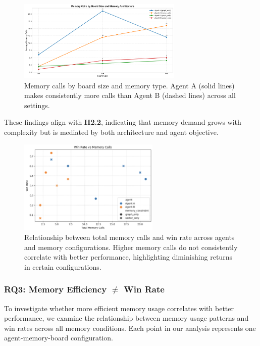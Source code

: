\documentclass[10pt]{article}
\begin{document}
\begin{figure}[ht]
\centering
\includegraphics[width=0.7\textwidth]{figures/memory_calls_by_board_size.png}
\caption{Memory calls by board size and memory type. Agent A (solid lines) makes consistently more calls than Agent B (dashed lines) across all settings.}
\label{fig:memory_calls}
\end{figure}

These findings align with \textbf{H2.2}, indicating that memory demand grows with complexity but is mediated by both architecture and agent objective.

\begin{figure}[ht]
    \centering
    \includegraphics[width=0.6\textwidth]{figures/analysis/scatter_win_rate.png}
    \caption{Relationship between total memory calls and win rate across agents and memory configurations. Higher memory calls do not consistently correlate with better performance, highlighting diminishing returns in certain configurations.}
    \label{fig:scatter_win_rate}
    \end{figure}

\subsubsection{RQ3: Memory Efficiency $\neq$ Win Rate}

To investigate whether more efficient memory usage correlates with better performance, we examine the relationship between memory usage patterns and win rates across all memory conditions. Each point in our analysis represents one agent-memory-board configuration.
\end{document}

